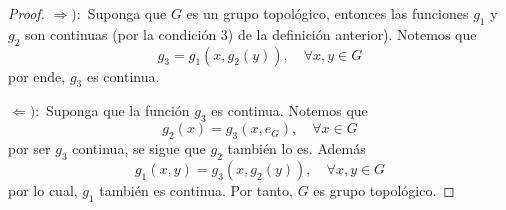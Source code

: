 \documentclass[12pt]{report}
\theoremstyle{largebreak}
\begin{document}
    \begin{proof}
        $\Rightarrow):$ Suponga que $G$ es un grupo topológico, entonces las funciones $g_1$ y $g_2$ son continuas (por la condición 3) de la definición anterior). Notemos que
        \begin{equation*}
            g_3=g_1(x,g_2(y)),\quad\forall x,y\in G
        \end{equation*}
        por ende, $g_3$ es continua.

        $\Leftarrow):$ Suponga que la función $g_3$ es continua. Notemos que
        \begin{equation*}
            g_2(x)=g_3(x,e_G),\quad\forall x\in G
        \end{equation*}
        por ser $g_3$ continua, se sigue que $g_2$ también lo es. Además
        \begin{equation*}
            g_1(x,y)=g_3(x,g_2(y)),\quad\forall x,y\in G
        \end{equation*}
        por lo cual, $g_1$ también es continua. Por tanto, $G$ es grupo topológico.
    \end{proof}

    
\end{document}

